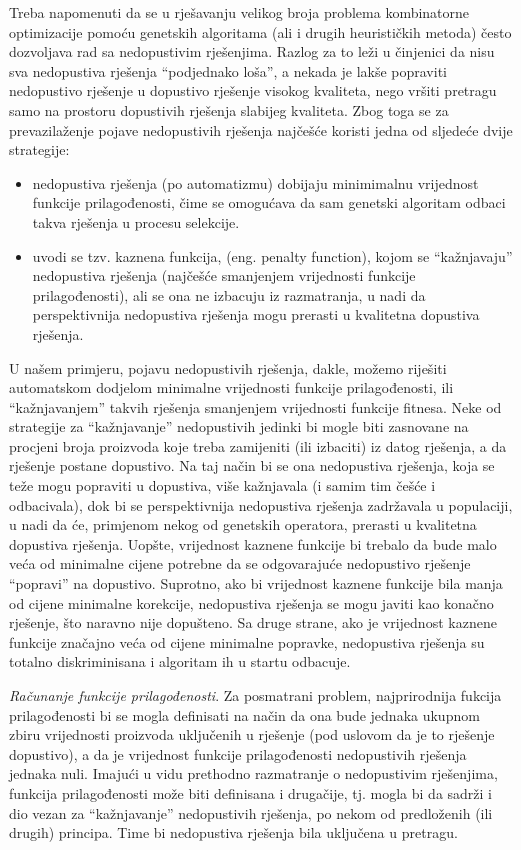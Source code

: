 \documentclass[a4paper, utf8, 11pt, colorlinks]{book}
\theoremstyle{definition}
\begin{document}
Treba napomenuti da se u rješavanju velikog broja problema kombinatorne optimizacije pomoću genetskih algoritama (ali i drugih heurističkih metoda) često dozvoljava rad sa nedopustivim rješenjima. Razlog za to leži u činjenici da nisu sva nedopustiva rješenja ``podjednako loša'', a nekada je lakše popraviti nedopustivo rješenje u dopustivo rješenje visokog kvaliteta, nego vršiti pretragu samo na prostoru dopustivih rješenja slabijeg kvaliteta.  Zbog toga se za prevazilaženje pojave nedopustivih rješenja najčešće koristi jedna od sljedeće dvije strategije: 
\begin{itemize}
	\item
	nedopustiva rješenja (po automatizmu) dobijaju minimimalnu vrijednost funkcije prilagođenosti, čime se omogućava da sam genetski algoritam odbaci takva rješenja u procesu selekcije. 
	
	\item uvodi se tzv. kaznena funkcija, (eng. penalty function), kojom se ``kažnjavaju'' nedopustiva rješenja (najčešće smanjenjem vrijednosti funkcije prilagođenosti), ali se ona ne izbacuju iz razmatranja, u nadi da perspektivnija nedopustiva rješenja mogu prerasti u kvalitetna dopustiva rješenja.
\end{itemize}

U našem primjeru, pojavu nedopustivih rješenja, dakle, možemo riješiti automatskom dodjelom minimalne vrijednosti funkcije prilagođenosti, ili ``kažnjavanjem'' takvih rješenja smanjenjem vrijednosti funkcije fitnesa. Neke od strategije za ``kažnjavanje'' nedopustivih jedinki bi mogle biti zasnovane na procjeni broja proizvoda koje treba zamijeniti (ili izbaciti) iz datog rješenja, a da rješenje postane dopustivo. Na taj način bi se ona nedopustiva rješenja, koja se teže mogu popraviti u dopustiva, više kažnjavala (i samim tim češće i odbacivala), dok bi se perspektivnija nedopustiva rješenja zadržavala u populaciji, u nadi da će, primjenom nekog od genetskih operatora, prerasti u kvalitetna dopustiva rješenja. Uopšte, vrijednost kaznene funkcije bi trebalo da bude malo veća od minimalne cijene potrebne da se odgovarajuće nedopustivo rješenje ``popravi'' na dopustivo. Suprotno, ako bi vrijednost kaznene funkcije bila manja od cijene minimalne korekcije, nedopustiva rješenja se mogu javiti kao konačno rješenje, što naravno nije dopušteno. Sa druge strane, ako je vrijednost kaznene funkcije značajno veća od cijene minimalne popravke, nedopustiva rješenja su totalno diskriminisana i algoritam ih u startu odbacuje. 

\emph{Računanje funkcije prilagođenosti}. Za posmatrani problem, najprirodnija fukcija prilagođenosti bi se mogla definisati na način da ona bude jednaka ukupnom zbiru vrijednosti proizvoda uključenih u rješenje (pod uslovom da je to rješenje dopustivo), a da je vrijednost funkcije prilagođenosti  nedopustivih rješenja   jednaka nuli. 
Imajući u vidu prethodno razmatranje o nedopustivim rješenjima, funkcija prilagođenosti može biti definisana i drugačije, tj. mogla bi da sadrži i dio vezan za  ``kažnjavanje'' nedopustivih rješenja, po nekom od predloženih (ili drugih) principa. Time bi nedopustiva rješenja bila uključena u pretragu.
\end{document}
